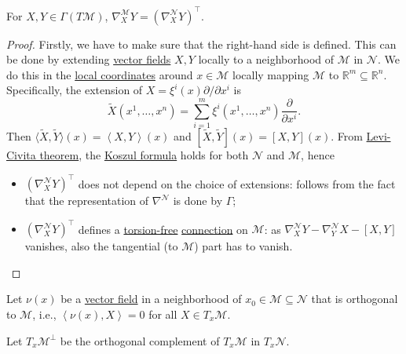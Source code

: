 \begin{theorem}\label{thm:immersion-induced-connection}
	For \(X, Y\in \Gamma (T \mathcal{M} )\), \(\nabla ^\mathcal{M} _X Y = \left( \nabla ^\mathcal{N} _X Y \right)^{\top} \).
\end{theorem}
\begin{proof}
	Firstly, we have to make sure that the right-hand side is defined. This can be done by extending \hyperref[def:vector-field]{vector fields} \(X, Y\) locally to a neighborhood of \(\mathcal{M} \) in \(\mathcal{N} \). We do this in the \hyperref[def:local-coordinate]{local coordinates} around \(x\in \mathcal{M} \) locally mapping \(\mathcal{M} \) to \(\mathbb{R} ^m \subseteq \mathbb{R} ^n\). Specifically, the extension of \(X = \xi ^i(x) \partial / \partial x^i\) is
	\[
		\widetilde{X} (x^1, \dots , x^n) = \sum_{i=1}^{m} \xi ^i(x^1, \dots , x^n) \frac{\partial }{\partial x^i}.
	\]
	Then \(\langle \widetilde{X} , \widetilde{Y} \rangle (x) = \left\langle X, Y \right\rangle (x)\) and \([\widetilde{X} , \widetilde{Y} ](x) = [X, Y](x)\). From \hyperref[thm:Levi-Civita]{Levi-Civita theorem}, the \hyperref[eq:Koszul-formula]{Koszul formula} holds for both \(\mathcal{N} \) and \(\mathcal{M} \), hence
	\begin{itemize}
		\item \((\nabla _X^{\mathcal{N}} Y)^{\top}\) does not depend on the choice of extensions: follows from the fact that the representation of \(\nabla ^\mathcal{N} \) is done by \(\Gamma \);
		\item \((\nabla _X^{\mathcal{N}} Y)^{\top}\) defines a \hyperref[def:torsion-free]{torsion-free} \hyperref[def:linear-connection]{connection} on \(\mathcal{M} \): as \(\nabla ^\mathcal{N} _X Y - \nabla ^\mathcal{N} _Y X - [X, Y]\) vanishes, also the tangential (to \(\mathcal{M} \)) part has to vanish.
	\end{itemize}
\end{proof}

Let \(\nu (x)\) be a \hyperref[def:vector-field]{vector field} in a neighborhood of \(x_0\in \mathcal{M} \subseteq \mathcal{N} \) that is orthogonal to \(\mathcal{M} \), i.e., \(\left\langle \nu (x), X \right\rangle = 0\) for all \(X\in T_x \mathcal{M} \).

\begin{center}
\end{center}

\begin{notation}
	Let \(T_x \mathcal{M} ^{\perp} \) be the orthogonal complement of \(T_x \mathcal{M} \) in \(T_x \mathcal{N} \).
\end{notation}

